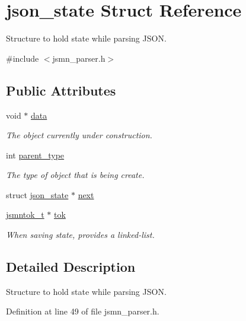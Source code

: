 \hypertarget{structjson__state}{\section{json\-\_\-state Struct Reference}
\label{structjson__state}
}


Structure to hold state while parsing J\-S\-O\-N.  




{\ttfamily \#include $<$jsmn\-\_\-parser.\-h$>$}

\subsection*{Public Attributes}
\begin{DoxyCompactItemize}
\item 
void $\ast$ \hyperlink{structjson__state_acc079826c9aec290370460c6a5b0cdc8}{data}
\begin{DoxyCompactList}\small\item\em The object currently under construction. \end{DoxyCompactList}\item 
int \hyperlink{structjson__state_a89afcce72accc1241265f843ec7d6f40}{parent\-\_\-type}
\begin{DoxyCompactList}\small\item\em The type of object that is being create. \end{DoxyCompactList}\item 
struct \hyperlink{structjson__state}{json\-\_\-state} $\ast$ \hyperlink{structjson__state_a62a49f4c9101a8e5a93a757c74060b25}{next}
\item 
\hyperlink{structjsmntok__t}{jsmntok\-\_\-t} $\ast$ \hyperlink{structjson__state_a4b6bd5d26604be1ca0783f1b36c01a9f}{tok}
\begin{DoxyCompactList}\small\item\em When saving state, provides a linked-\/list. \end{DoxyCompactList}\end{DoxyCompactItemize}


\subsection{Detailed Description}
Structure to hold state while parsing J\-S\-O\-N. 

Definition at line 49 of file jsmn\-\_\-parser.\-h.



